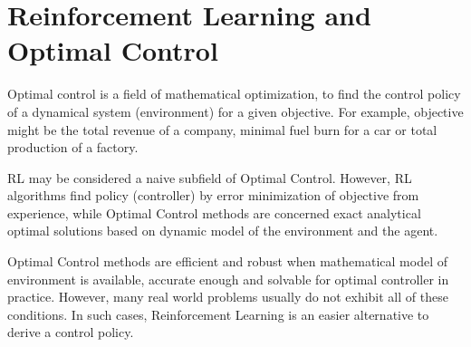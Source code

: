 \section{Reinforcement Learning and Optimal Control}
\label{sec:rl_and_control}

Optimal control is a field of mathematical optimization, to find the control policy of a dynamical system (environment) for a given objective. 
For example, objective might be the total revenue of a company, 
minimal fuel burn for a car or total production of a factory. 

RL may be considered a naive subfield of Optimal Control. 
However, RL algorithms find policy (controller) by error minimization of objective from experience, 
while Optimal Control methods are concerned exact analytical optimal solutions based on dynamic model of the environment and the agent. 

Optimal Control methods are efficient and robust when mathematical model of environment is available, 
accurate enough and solvable for optimal controller in practice. 
However, many real world problems usually do not exhibit all of these conditions. 
In such cases, Reinforcement Learning is an easier alternative to derive a control policy.
